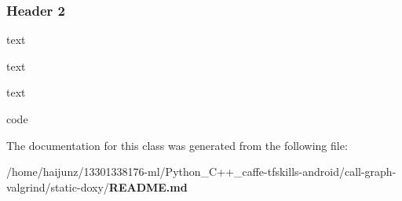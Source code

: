 \subsubsection{Header 2}\label{classhidden_labelid2}

\begin{DoxyPre}
text\end{DoxyPre}



\begin{DoxyPre} text\end{DoxyPre}



\begin{DoxyPre}  text\end{DoxyPre}



\begin{DoxyPre}   code
\end{DoxyPre}


The documentation for this class was generated from the following file\-:\begin{DoxyCompactItemize}
\item 
/home/haijunz/13301338176-\/ml/\-Python\-\_\-\-C++\-\_\-caffe-\/tfskills-\/android/call-\/graph-\/valgrind/static-\/doxy/{\bf R\-E\-A\-D\-M\-E.\-md}\end{DoxyCompactItemize}
